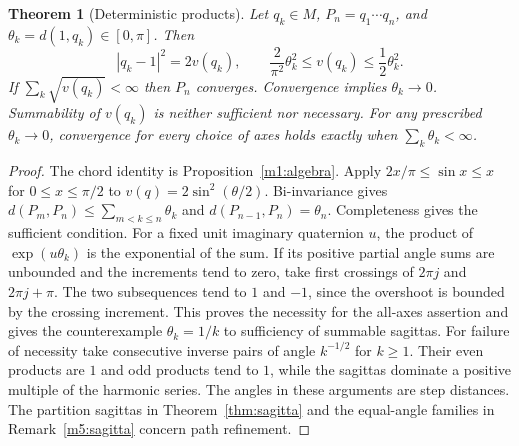 \documentclass[11pt,reqno]{amsart}
\newtheorem{theorem}{Theorem}[section]
\theoremstyle{definition}
\theoremstyle{remark}
\numberwithin{equation}{section}
\begin{document}
\begin{theorem}[Deterministic products]\label{m6:det-product}
Let \(q_k\in M\), \(P_n=q_1\cdots q_n\), and
\(\theta_k=d(1,q_k)\in[0,\pi]\). Then
\[
 |q_k-1|^2=2v(q_k),\qquad
 \frac{2}{\pi^2}\theta_k^2\le v(q_k)\le \frac12\theta_k^2.
\]
If \(\sum_k\sqrt{v(q_k)}<\infty\) then \(P_n\) converges.
Convergence implies \(\theta_k\to0\). Summability of \(v(q_k)\)
is neither sufficient nor necessary. For any prescribed
\(\theta_k\to0\), convergence for every choice of axes holds
exactly when \(\sum_k\theta_k<\infty\).
\end{theorem}
\begin{proof}
The chord identity is Proposition~\ref{m1:algebra}. Apply
\(2x/\pi\le\sin x\le x\) for \(0\le x\le\pi/2\) to
\(v(q)=2\sin^2(\theta/2)\). Bi-invariance gives
\(d(P_m,P_n)\le\sum_{m<k\le n}\theta_k\) and
\(d(P_{n-1},P_n)=\theta_n\). Completeness gives the sufficient
condition. For a fixed unit imaginary quaternion \(u\), the
product of \(\exp(u\theta_k)\) is the exponential of the sum.
If its positive partial angle sums are unbounded and the increments
tend to zero, take first crossings of \(2\pi j\) and \(2\pi j+\pi\).
The two subsequences tend to \(1\) and \(-1\), since the overshoot
is bounded by the crossing increment. This proves the necessity
for the all-axes assertion and gives the counterexample
\(\theta_k=1/k\) to sufficiency of summable sagittas.
For failure of necessity take consecutive inverse pairs of angle
\(k^{-1/2}\) for \(k\ge1\). Their even products are \(1\) and
odd products tend to \(1\), while the sagittas dominate a positive
multiple of the harmonic series. The angles in these arguments
are step distances. The partition sagittas in
Theorem~\ref{thm:sagitta} and the equal-angle families in
Remark~\ref{m5:sagitta} concern path refinement.
\end{proof}
\end{document}
